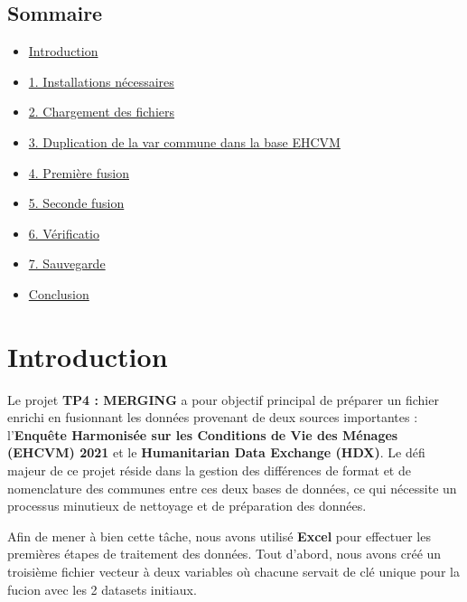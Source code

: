 \documentclass[
]{article}
\providecommand{\tightlist}{%
  \setlength{\itemsep}{0pt}\setlength{\parskip}{0pt}}
\begin{document}
\hypertarget{sommaire}{%
\subsection{Sommaire}\label{sommaire}}

\begin{itemize}
\tightlist
\item
  \protect\hyperlink{introduction}{Introduction}
\item
  \protect\hyperlink{installations-nuxe9cessaires}{1. Installations
  nécessaires}
\item
  \protect\hyperlink{chargement-des-fichiers}{2. Chargement des
  fichiers}
\item
  \protect\hyperlink{duplication-de-la-var-commune-dans-la-base-ehcvm}{3.
  Duplication de la var commune dans la base EHCVM}
\item
  \protect\hyperlink{premiuxe8re-fusion}{4. Première fusion}
\item
  \protect\hyperlink{seconde-fusion}{5. Seconde fusion}
\item
  \protect\hyperlink{vuxe9rification}{6. Vérificatio}
\item
  \protect\hyperlink{sauvegarde}{7. Sauvegarde}
\item
  \protect\hyperlink{conclusion}{Conclusion}
\end{itemize}

\newpage

\hypertarget{introduction}{%
\section{Introduction}\label{introduction}}

Le projet \textbf{TP4 : MERGING} a pour objectif principal de préparer
un fichier enrichi en fusionnant les données provenant de deux sources
importantes : l'\textbf{Enquête Harmonisée sur les Conditions de Vie des
Ménages (EHCVM) 2021} et le \textbf{Humanitarian Data Exchange (HDX)}.
Le défi majeur de ce projet réside dans la gestion des différences de
format et de nomenclature des communes entre ces deux bases de données,
ce qui nécessite un processus minutieux de nettoyage et de préparation
des données.

Afin de mener à bien cette tâche, nous avons utilisé \textbf{Excel} pour
effectuer les premières étapes de traitement des données. Tout d'abord,
nous avons créé un troisième fichier vecteur à deux variables où chacune
servait de clé unique pour la fucion avec les 2 datasets initiaux.
\end{document}
